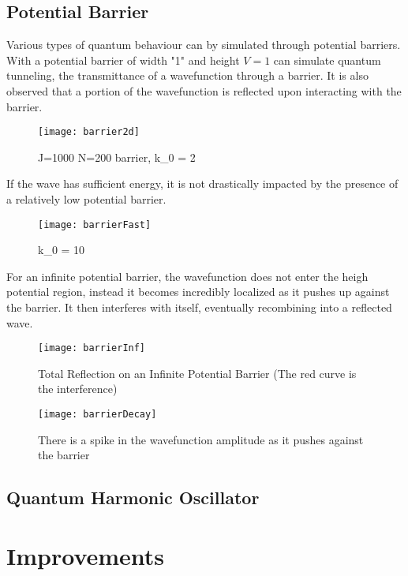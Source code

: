 \documentclass[twoside,twocolumn]{article}
\begin{document}
\subsection{Potential Barrier}
Various types of quantum behaviour can by simulated through potential barriers. With a potential barrier of width "1" and height $V = 1$ can simulate quantum tunneling, the transmittance of a wavefunction through a barrier. It is also observed that a portion of the wavefunction is reflected upon interacting with the barrier.
\begin{figure}[H]
\centering
\texttt{[image: barrier2d]}
\caption{J=1000 N=200 barrier, k_0 = 2}
\label{}
\end{figure}
If the wave has sufficient energy, it is not drastically impacted by the presence of a relatively low potential barrier.
\begin{figure}[H]
\centering
\texttt{[image: barrierFast]}
\caption{k_0 = 10}
\label{}
\end{figure}
For an infinite potential barrier, the wavefunction does not enter the heigh potential region, instead it becomes incredibly localized as it pushes up against the barrier. It then interferes with itself, eventually recombining into a reflected wave.
\begin{figure}[H]
\centering
\texttt{[image: barrierInf]}
\caption{Total Reflection on an Infinite Potential Barrier (The red curve is the interference)}
\label{}
\end{figure}
\begin{figure}[htp]
\centering
\texttt{[image: barrierDecay]}
\caption{There is a spike in the wavefunction amplitude as it pushes against the barrier}
\label{}
\end{figure}
\subsection{Quantum Harmonic Oscillator}
\section{Improvements}


\end{document}
